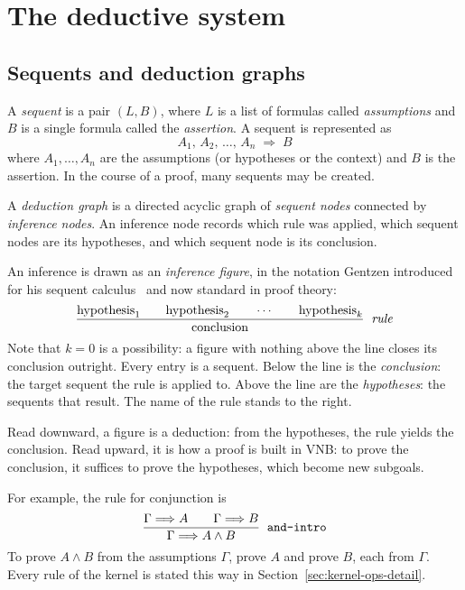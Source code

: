 \chapter{The deductive system}
\label{ch:proofs}

\section{Sequents and deduction graphs}\label{section:sequents}

A \emph{sequent} is a pair $(L, B)$, where $L$ is a list of formulas
called \emph{assumptions} and $B$ is a single formula called the
\emph{assertion}.  A sequent is represented as
\[
  A_1,\, A_2,\, \ldots,\, A_n \;\Longrightarrow\; B
\]
where $A_1, \ldots, A_n$ are the assumptions (or hypotheses or the context) and $B$
is the assertion. In the course of a proof, many sequents may be created.

A \emph{deduction graph} is a directed acyclic graph of
\emph{sequent nodes} connected by \emph{inference nodes}.  An inference
node records which rule was applied, which sequent nodes are its
hypotheses, and which sequent node is its conclusion.

An inference is drawn as an \emph{inference figure}, in the notation
Gentzen introduced for his sequent calculus~\cite{Gentzen1935} and now standard in
proof theory:
\[
  \frac{\text{hypothesis}_1 \qquad \text{hypothesis}_2 \qquad \cdots \qquad \text{hypothesis}_k}
       {\text{conclusion}}
  \;\;\mbox{\textit{rule}}
\]
Note that $k = 0$ is a possibility: a figure with nothing above the
line closes its conclusion outright.  Every entry is a sequent.  Below the line is the \emph{conclusion}: the
target sequent the rule is applied to.  Above the line are the
\emph{hypotheses}: the sequents that result.  The name of the rule
stands to the right.

Read downward, a figure is a deduction: from the hypotheses, the rule
yields the conclusion.  Read upward, it is how a proof is built in VNB:
to prove the conclusion, it suffices to prove the hypotheses, which
become new subgoals.

For example, the rule for conjunction is
\[
  \frac{\Gamma \Longrightarrow A \qquad \Gamma \Longrightarrow B}
       {\Gamma \Longrightarrow A \wedge B}
  \;\;\mbox{\texttt{and-intro}}
\]
To prove $A \wedge B$ from the assumptions $\Gamma$, prove $A$ and
prove $B$, each from $\Gamma$.  Every rule of the kernel is stated
this way in Section~\ref{sec:kernel-ops-detail}.

